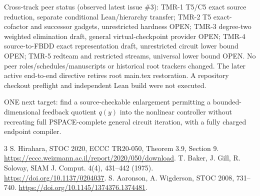 \documentclass[11pt]{article}
\begin{document}
Cross-track peer status (observed latest issue \#3): TMR-1 T5/C5 exact source reduction, separate conditional Lean/hierarchy transfer; TMR-2 T5 exact-cofactor and successor gadgets, unrestricted hardness OPEN; TMR-3 degree-two weighted elimination draft, general virtual-checkpoint provider OPEN; TMR-4 source-to-FBDD exact representation draft, unrestricted circuit lower bound OPEN; TMR-5 redteam and restricted streams, universal lower bound OPEN. No peer roles/schedules/manuscripts or historical root trackers changed. The later active end-to-end directive retires root main.tex restoration. A repository checkout preflight and independent Lean build were not executed.

ONE next target: find a source-checkable enlargement permitting a bounded-dimensional feedback quotient $q(y)$ into the nonlinear controller without recreating full PSPACE-complete general circuit iteration, with a fully charged endpoint compiler.

\begin{thebibliography}{3}
 S. Hirahara, STOC 2020, ECCC TR20-050, Theorem 3.9, Section 9. \url{https://eccc.weizmann.ac.il/report/2020/050/download}.
 T. Baker, J. Gill, R. Solovay, SIAM J. Comput. 4(4), 431--442 (1975). \url{https://doi.org/10.1137/0204037}.
 S. Aaronson, A. Wigderson, STOC 2008, 731--740. \url{https://doi.org/10.1145/1374376.1374481}.
\end{thebibliography}
\end{document}
